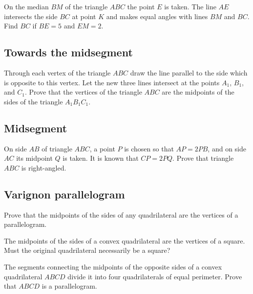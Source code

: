 \documentclass{article}
\begin{document}
\problem

On the median $BM$ of the triangle $ABC$ the point $E$ is taken. The line $AE$ intersects the side $BC$ at point $K$ and makes equal angles with lines $BM$ and $BC$. Find $BC$ if $BE = 5$ and $EM = 2$.

\eproblem

\subsection*{Towards the midsegment}

\problem

Through each vertex of the triangle $ABC$ draw the line parallel to the side which is opposite to this vertex. Let the new three lines intersect at the points $A_1$, $B_1$, and $C_1$. Prove that the vertices of the triangle $ABC$ are the midpoints of the sides of the triangle $A_1 B_1 C_1$.

\eproblem

\subsection*{Midsegment}

\problem

On side $AB$ of triangle $ABC$, a point $P$ is chosen so that $AP = 2PB$, and on side $AC$ its midpoint $Q$ is taken. It is known that $CP = 2PQ$. Prove that triangle $ABC$ is right-angled.

\eproblem

\subsection*{Varignon parallelogram}

\problem

Prove that the midpoints of the sides of any quadrilateral are the vertices of a parallelogram.

\eproblem

\problem

The midpoints of the sides of a convex quadrilateral are the vertices of a square. Must the original quadrilateral necessarily be a square?

\eproblem

\problem

The segments connecting the midpoints of the opposite sides of a convex quadrilateral $ABCD$ divide it into four quadrilaterals of equal perimeter. Prove that $ABCD$ is a parallelogram.

\eproblem
\end{document}
